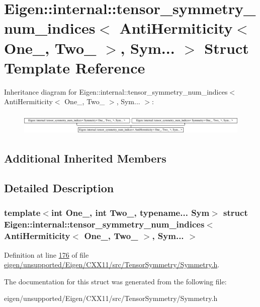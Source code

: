 \hypertarget{struct_eigen_1_1internal_1_1tensor__symmetry__num__indices_3_01_anti_hermiticity_3_01_one___00_00182a5a3b195af54d2fe6bb829d4e663}{}\section{Eigen\+:\+:internal\+:\+:tensor\+\_\+symmetry\+\_\+num\+\_\+indices$<$ Anti\+Hermiticity$<$ One\+\_\+, Two\+\_\+ $>$, Sym... $>$ Struct Template Reference}
\label{struct_eigen_1_1internal_1_1tensor__symmetry__num__indices_3_01_anti_hermiticity_3_01_one___00_00182a5a3b195af54d2fe6bb829d4e663}
Inheritance diagram for Eigen\+:\+:internal\+:\+:tensor\+\_\+symmetry\+\_\+num\+\_\+indices$<$ Anti\+Hermiticity$<$ One\+\_\+, Two\+\_\+ $>$, Sym... $>$\+:\begin{figure}[H]
\begin{center}
\leavevmode
\includegraphics[height=1.072797cm]{struct_eigen_1_1internal_1_1tensor__symmetry__num__indices_3_01_anti_hermiticity_3_01_one___00_00182a5a3b195af54d2fe6bb829d4e663}
\end{center}
\end{figure}
\subsection*{Additional Inherited Members}


\subsection{Detailed Description}
\subsubsection*{template$<$int One\+\_\+, int Two\+\_\+, typename... Sym$>$\newline
struct Eigen\+::internal\+::tensor\+\_\+symmetry\+\_\+num\+\_\+indices$<$ Anti\+Hermiticity$<$ One\+\_\+, Two\+\_\+ $>$, Sym... $>$}



Definition at line \hyperlink{eigen_2unsupported_2_eigen_2_c_x_x11_2src_2_tensor_symmetry_2_symmetry_8h_source_l00176}{176} of file \hyperlink{eigen_2unsupported_2_eigen_2_c_x_x11_2src_2_tensor_symmetry_2_symmetry_8h_source}{eigen/unsupported/\+Eigen/\+C\+X\+X11/src/\+Tensor\+Symmetry/\+Symmetry.\+h}.



The documentation for this struct was generated from the following file\+:\begin{DoxyCompactItemize}
\item 
eigen/unsupported/\+Eigen/\+C\+X\+X11/src/\+Tensor\+Symmetry/\+Symmetry.\+h\end{DoxyCompactItemize}
